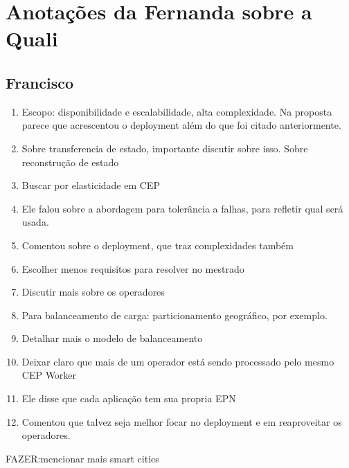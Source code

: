 \section{Anotações da Fernanda sobre a Quali}
\subsection{Francisco}
\begin{enumerate}
\item Escopo: disponibilidade e escalabilidade, alta complexidade. Na proposta parece que acrescentou o deployment além do que foi citado anteriormente.
\item Sobre transferencia de estado, importante discutir sobre isso. Sobre reconstrução de estado
\item Buscar por elasticidade em CEP
\item Ele falou sobre a abordagem para tolerância a falhas, para refletir qual será usada.
\item Comentou sobre o deployment, que traz complexidades também
\item Escolher menos requisitos para resolver no mestrado
\item Discutir mais sobre os operadores
\item Para balanceamento de carga: particionamento geográfico, por exemplo.
\item Detalhar mais o modelo de balanceamento
\item Deixar claro que mais de um operador está sendo processado pelo mesmo CEP Worker
\item Ele disse que cada aplicação tem sua propria EPN
\item Comentou que talvez seja melhor focar no deployment e em reaproveitar os operadores. 
\end{enumerate}


FAZER:mencionar mais smart cities


